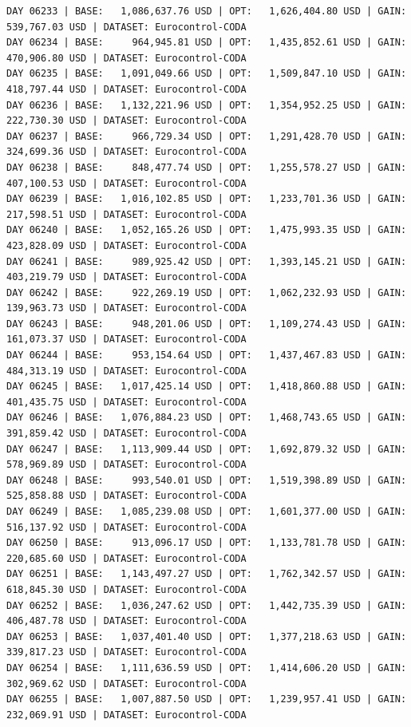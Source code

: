 \documentclass[11pt,a4paper]{article}
\begin{document}
\begin{verbatim}
DAY 06233 | BASE:   1,086,637.76 USD | OPT:   1,626,404.80 USD | GAIN: 539,767.03 USD | DATASET: Eurocontrol-CODA
DAY 06234 | BASE:     964,945.81 USD | OPT:   1,435,852.61 USD | GAIN: 470,906.80 USD | DATASET: Eurocontrol-CODA
DAY 06235 | BASE:   1,091,049.66 USD | OPT:   1,509,847.10 USD | GAIN: 418,797.44 USD | DATASET: Eurocontrol-CODA
DAY 06236 | BASE:   1,132,221.96 USD | OPT:   1,354,952.25 USD | GAIN: 222,730.30 USD | DATASET: Eurocontrol-CODA
DAY 06237 | BASE:     966,729.34 USD | OPT:   1,291,428.70 USD | GAIN: 324,699.36 USD | DATASET: Eurocontrol-CODA
DAY 06238 | BASE:     848,477.74 USD | OPT:   1,255,578.27 USD | GAIN: 407,100.53 USD | DATASET: Eurocontrol-CODA
DAY 06239 | BASE:   1,016,102.85 USD | OPT:   1,233,701.36 USD | GAIN: 217,598.51 USD | DATASET: Eurocontrol-CODA
DAY 06240 | BASE:   1,052,165.26 USD | OPT:   1,475,993.35 USD | GAIN: 423,828.09 USD | DATASET: Eurocontrol-CODA
DAY 06241 | BASE:     989,925.42 USD | OPT:   1,393,145.21 USD | GAIN: 403,219.79 USD | DATASET: Eurocontrol-CODA
DAY 06242 | BASE:     922,269.19 USD | OPT:   1,062,232.93 USD | GAIN: 139,963.73 USD | DATASET: Eurocontrol-CODA
DAY 06243 | BASE:     948,201.06 USD | OPT:   1,109,274.43 USD | GAIN: 161,073.37 USD | DATASET: Eurocontrol-CODA
DAY 06244 | BASE:     953,154.64 USD | OPT:   1,437,467.83 USD | GAIN: 484,313.19 USD | DATASET: Eurocontrol-CODA
DAY 06245 | BASE:   1,017,425.14 USD | OPT:   1,418,860.88 USD | GAIN: 401,435.75 USD | DATASET: Eurocontrol-CODA
DAY 06246 | BASE:   1,076,884.23 USD | OPT:   1,468,743.65 USD | GAIN: 391,859.42 USD | DATASET: Eurocontrol-CODA
DAY 06247 | BASE:   1,113,909.44 USD | OPT:   1,692,879.32 USD | GAIN: 578,969.89 USD | DATASET: Eurocontrol-CODA
DAY 06248 | BASE:     993,540.01 USD | OPT:   1,519,398.89 USD | GAIN: 525,858.88 USD | DATASET: Eurocontrol-CODA
DAY 06249 | BASE:   1,085,239.08 USD | OPT:   1,601,377.00 USD | GAIN: 516,137.92 USD | DATASET: Eurocontrol-CODA
DAY 06250 | BASE:     913,096.17 USD | OPT:   1,133,781.78 USD | GAIN: 220,685.60 USD | DATASET: Eurocontrol-CODA
DAY 06251 | BASE:   1,143,497.27 USD | OPT:   1,762,342.57 USD | GAIN: 618,845.30 USD | DATASET: Eurocontrol-CODA
DAY 06252 | BASE:   1,036,247.62 USD | OPT:   1,442,735.39 USD | GAIN: 406,487.78 USD | DATASET: Eurocontrol-CODA
DAY 06253 | BASE:   1,037,401.40 USD | OPT:   1,377,218.63 USD | GAIN: 339,817.23 USD | DATASET: Eurocontrol-CODA
DAY 06254 | BASE:   1,111,636.59 USD | OPT:   1,414,606.20 USD | GAIN: 302,969.62 USD | DATASET: Eurocontrol-CODA
DAY 06255 | BASE:   1,007,887.50 USD | OPT:   1,239,957.41 USD | GAIN: 232,069.91 USD | DATASET: Eurocontrol-CODA

\end{verbatim}
\end{document}
